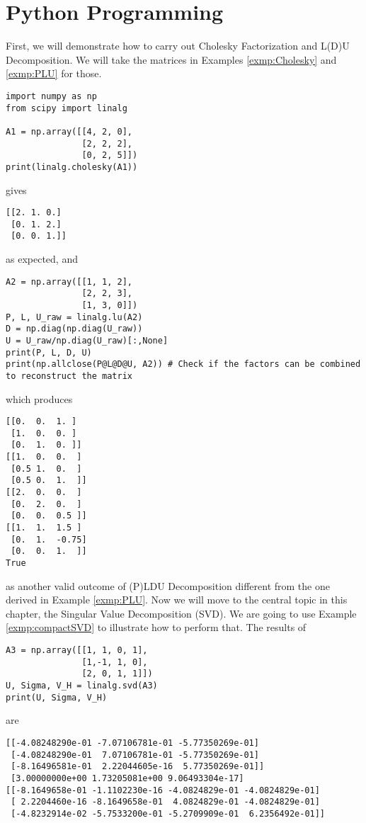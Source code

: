 \section{Python Programming}
First, we will demonstrate how to carry out Cholesky Factorization and L(D)U Decomposition. We will take the matrices in Examples \ref{exmp:Cholesky} and \ref{exmp:PLU} for those.
\begin{lstlisting}
import numpy as np
from scipy import linalg

A1 = np.array([[4, 2, 0],
               [2, 2, 2],
               [0, 2, 5]])
print(linalg.cholesky(A1))
\end{lstlisting}
gives
\begin{lstlisting}
[[2. 1. 0.]
 [0. 1. 2.]
 [0. 0. 1.]]    
\end{lstlisting}
as expected, and
\begin{lstlisting}
A2 = np.array([[1, 1, 2],
               [2, 2, 3],
               [1, 3, 0]])
P, L, U_raw = linalg.lu(A2)
D = np.diag(np.diag(U_raw))
U = U_raw/np.diag(U_raw)[:,None]
print(P, L, D, U)
print(np.allclose(P@L@D@U, A2)) # Check if the factors can be combined to reconstruct the matrix
\end{lstlisting}
which produces
\begin{lstlisting}
[[0.  0.  1. ]
 [1.  0.  0. ]
 [0.  1.  0. ]] 
[[1.  0.  0.  ]
 [0.5 1.  0.  ]
 [0.5 0.  1.  ]] 
[[2.  0.  0.  ]
 [0.  2.  0.  ]
 [0.  0.  0.5 ]] 
[[1.  1.  1.5 ]
 [0.  1.  -0.75]
 [0.  0.  1.  ]]
True
\end{lstlisting}
as another valid outcome of (P)LDU Decomposition different from the one derived in Example \ref{exmp:PLU}. Now we will move to the central topic in this chapter, the Singular Value Decomposition (SVD). We are going to use Example \ref{exmp:compactSVD} to illustrate how to perform that. The results of
\begin{lstlisting}
A3 = np.array([[1, 1, 0, 1],
               [1,-1, 1, 0],
               [2, 0, 1, 1]])
U, Sigma, V_H = linalg.svd(A3)
print(U, Sigma, V_H)
\end{lstlisting}
are
\begin{lstlisting}
[[-4.08248290e-01 -7.07106781e-01 -5.77350269e-01]
 [-4.08248290e-01  7.07106781e-01 -5.77350269e-01]
 [-8.16496581e-01  2.22044605e-16  5.77350269e-01]] 
 [3.00000000e+00 1.73205081e+00 9.06493304e-17] 
[[-8.1649658e-01 -1.1102230e-16 -4.0824829e-01 -4.0824829e-01]
 [ 2.2204460e-16 -8.1649658e-01  4.0824829e-01 -4.0824829e-01]
 [-4.8232914e-02 -5.7533200e-01 -5.2709909e-01  6.2356492e-01]]    
\end{lstlisting}
